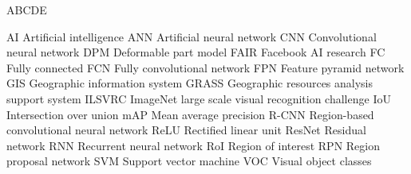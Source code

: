
\begin{seznamzkratek}{ABCDE}

	      {AI}
	      {Artificial intelligence}
	      {ANN}
	      {Artificial neural network}
	      {CNN}
	      {Convolutional neural network}
	      {DPM}
	      {Deformable part model}
	      {FAIR}
	      {Facebook AI research}
	      {FC}
	      {Fully connected}
	      {FCN}
	      {Fully convolutional network}
	      {FPN}
	      {Feature pyramid network}
	      {GIS}
	      {Geographic information system}
	      {GRASS}
	      {Geographic resources analysis support system}
	      {ILSVRC}
	      {ImageNet large scale visual recognition challenge}
	      {IoU}
	      {Intersection over union}
	      {mAP}
	      {Mean average precision}
	      {R-CNN}
	      {Region-based convolutional neural network}
	      {ReLU}
	      {Rectified linear unit}
	      {ResNet}
	      {Residual network}
	      {RNN}
	      {Recurrent neural network}
	      {RoI}
	      {Region of interest}
	      {RPN}
	      {Region proposal network}
	      {SVM}
	      {Support vector machine}
	      {VOC}
	      {Visual object classes}
	      
\end{seznamzkratek}